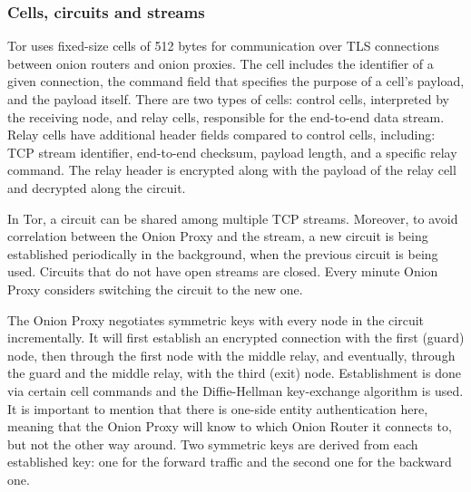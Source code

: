 \subsubsection{Cells, circuits and streams}
Tor uses fixed-size cells of 512 bytes for communication over TLS connections between onion routers and onion proxies. The cell includes the identifier of a given connection, the command field that specifies the purpose of a cell's payload, and the payload itself. There are two types of cells: control cells, interpreted by the receiving node, and relay cells, responsible for the end-to-end data stream. Relay cells have additional header fields compared to control cells, including: TCP stream identifier, end-to-end checksum, payload length, and a specific relay command. The relay header is encrypted along with the payload of the relay cell and decrypted along the circuit.

In Tor, a circuit can be shared among multiple TCP streams. Moreover, to avoid correlation between the Onion Proxy and the stream, a new circuit is being established periodically in the background, when the previous circuit is being used. Circuits that do not have open streams are closed. Every minute Onion Proxy considers switching the circuit to the new one.

The Onion Proxy negotiates symmetric keys with every node in the circuit incrementally. It will first establish an encrypted connection with the first (guard) node, then through the first node with the middle relay, and eventually, through the guard and the middle relay, with the third (exit) node. Establishment is done via certain cell commands and the Diffie-Hellman key-exchange algorithm is used. It is important to mention that there is one-side entity authentication here, meaning that the Onion Proxy will know to which Onion Router it connects to, but not the other way around. Two symmetric keys are derived from each established key: one for the forward traffic and the second one for the backward one.

